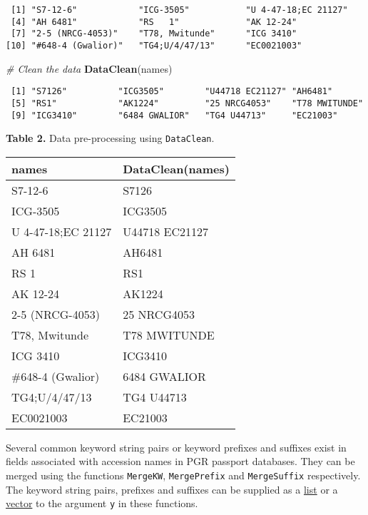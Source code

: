 \documentclass[]{article}
\newenvironment{Shaded}{\begin{snugshade}}{\end{snugshade}}
\newcommand{\CommentTok}[1]{\textcolor[rgb]{0.56,0.35,0.01}{\textit{#1}}}
\newcommand{\KeywordTok}[1]{\textcolor[rgb]{0.13,0.29,0.53}{\textbf{#1}}}
\newcommand{\NormalTok}[1]{#1}
\begin{document}
\begin{verbatim}
 [1] "S7-12-6"            "ICG-3505"           "U 4-47-18;EC 21127"
 [4] "AH 6481"            "RS   1"             "AK 12-24"          
 [7] "2-5 (NRCG-4053)"    "T78, Mwitunde"      "ICG 3410"          
[10] "#648-4 (Gwalior)"   "TG4;U/4/47/13"      "EC0021003"         
\end{verbatim}

\begin{Shaded}
\begin{Highlighting}[]
\CommentTok{# Clean the data}
\KeywordTok{DataClean}\NormalTok{(names)}
\end{Highlighting}
\end{Shaded}

\begin{verbatim}
 [1] "S7126"          "ICG3505"        "U44718 EC21127" "AH6481"        
 [5] "RS1"            "AK1224"         "25 NRCG4053"    "T78 MWITUNDE"  
 [9] "ICG3410"        "6484 GWALIOR"   "TG4 U44713"     "EC21003"       
\end{verbatim}

\textbf{Table 2.} Data pre-processing using \texttt{DataClean}.

\begin{longtable}[]{@{}ll@{}}
\toprule
\textbf{names} & \textbf{DataClean(names)}\tabularnewline
\midrule
\endhead
S7-12-6 & S7126\tabularnewline
ICG-3505 & ICG3505\tabularnewline
U 4-47-18;EC 21127 & U44718 EC21127\tabularnewline
AH 6481 & AH6481\tabularnewline
RS 1 & RS1\tabularnewline
AK 12-24 & AK1224\tabularnewline
2-5 (NRCG-4053) & 25 NRCG4053\tabularnewline
T78, Mwitunde & T78 MWITUNDE\tabularnewline
ICG 3410 & ICG3410\tabularnewline
\#648-4 (Gwalior) & 6484 GWALIOR\tabularnewline
TG4;U/4/47/13 & TG4 U44713\tabularnewline
EC0021003 & EC21003\tabularnewline
\bottomrule
\end{longtable}

Several common keyword string pairs or keyword prefixes and suffixes
exist in fields associated with accession names in PGR passport
databases. They can be merged using the functions \texttt{MergeKW},
\texttt{MergePrefix} and \texttt{MergeSuffix} respectively. The keyword
string pairs, prefixes and suffixes can be supplied as a
\href{http://google.com/\#q=\%5BR\%5D+list}{list} or a
\href{http://google.com/\#q=\%5BR\%5D+vector}{vector} to the argument
\texttt{y} in these functions.
\end{document}
